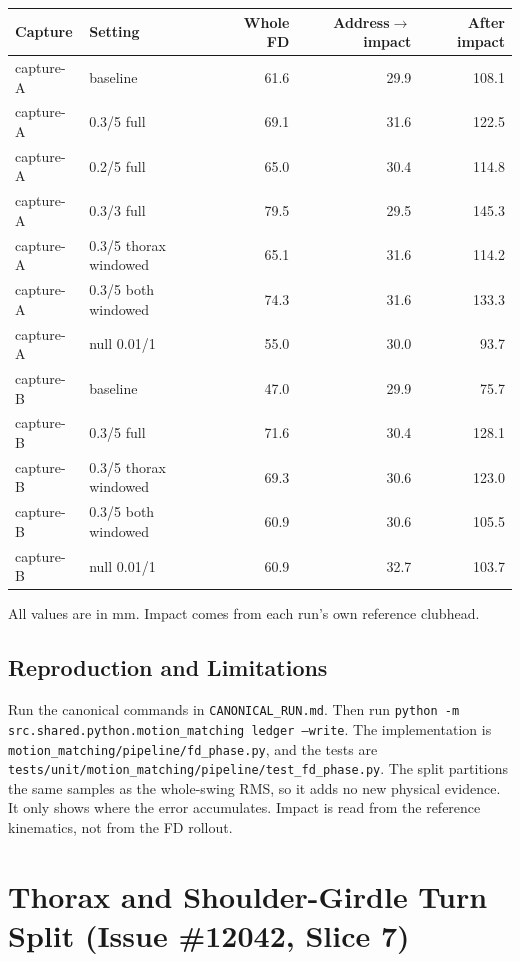 \documentclass[11pt,a4paper]{article}
\begin{document}
\begin{center}
\begin{tabular}{llrrr}
\hline
Capture & Setting & Whole FD & Address$\to$impact & After impact \\
\hline
capture-A & baseline & 61.6 & 29.9 & 108.1 \\
capture-A & 0.3/5 full & 69.1 & 31.6 & 122.5 \\
capture-A & 0.2/5 full & 65.0 & 30.4 & 114.8 \\
capture-A & 0.3/3 full & 79.5 & 29.5 & 145.3 \\
capture-A & 0.3/5 thorax windowed & 65.1 & 31.6 & 114.2 \\
capture-A & 0.3/5 both windowed & 74.3 & 31.6 & 133.3 \\
capture-A & null 0.01/1 & 55.0 & 30.0 & 93.7 \\
capture-B & baseline & 47.0 & 29.9 & 75.7 \\
capture-B & 0.3/5 full & 71.6 & 30.4 & 128.1 \\
capture-B & 0.3/5 thorax windowed & 69.3 & 30.6 & 123.0 \\
capture-B & 0.3/5 both windowed & 60.9 & 30.6 & 105.5 \\
capture-B & null 0.01/1 & 60.9 & 32.7 & 103.7 \\
\hline
\end{tabular}
\end{center}
All values are in mm. Impact comes from each run's own reference clubhead.

\subsection{Reproduction and Limitations}
Run the canonical commands in \texttt{CANONICAL\_RUN.md}. Then run
\texttt{python -m src.shared.python.motion\_matching ledger --write}. The
implementation is \texttt{motion\_matching/pipeline/fd\_phase.py}, and the
tests are \texttt{tests/unit/motion\_matching/pipeline/test\_fd\_phase.py}. The
split partitions the same samples as the whole-swing RMS, so it adds no new
physical evidence. It only shows where the error accumulates. Impact is read
from the reference kinematics, not from the FD rollout.
\section{Thorax and Shoulder-Girdle Turn Split (Issue \#12042, Slice 7)}
\label{sec:turn_split}
\end{document}
